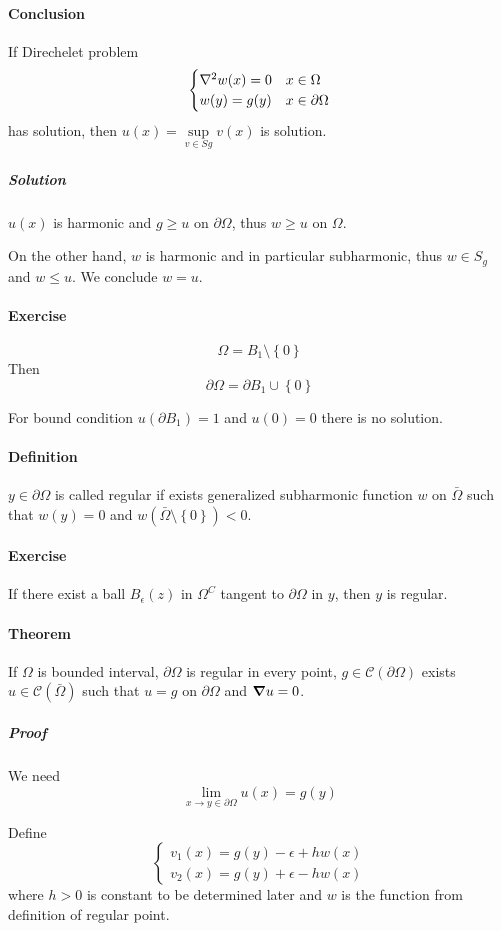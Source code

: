 \paragraph{Conclusion}
If Direchelet problem
$$\begin{cases}
\laplacian{w}(x) = 0 & x\in \Omega\\
w(y) = g(y) & x \in \partial \Omega
\end{cases}$$
has solution, then $u(x)=\sup\limits_{v\in S g} v(x)$ is solution.
\subparagraph{Solution}
$u(x)$ is harmonic and $g \geq u$ on $\partial \Omega$, thus $w\geq u$ on $\Omega$.

On the other hand, $w$ is harmonic and in particular subharmonic, thus $w\in S_g$ and $w\leq u$. We conclude $w=u$.
\paragraph{Exercise}
$$\Omega = B_1 \setminus \left\{ 0 \right\}$$
Then
$$\partial \Omega = \partial B_1 \cup \left\{ 0 \right\}$$

For bound condition $u(\partial B_1) = 1$ and $u(0)=0$ there is no solution.
\paragraph{Definition}
$y\in \partial \Omega$ is called regular if exists generalized subharmonic function $w$ on $\bar{\Omega}$ such that $w(y)=0$ and $w(\bar{\Omega} \setminus \left\{0\right\}) < 0$.
\paragraph{Exercise}
If there exist a ball $B_\epsilon(z)$ in $\Omega^C$ tangent to $\partial \Omega$ in $y$, then $y$ is regular. 
\paragraph{Theorem} If $\Omega$ is bounded interval, $\partial \Omega $ is regular in every point, $g\in \mathcal{C}(\partial \Omega)$  exists $u \in \mathcal{C}(\bar{\Omega})$ such that $u=g$ on  $\partial \Omega $ and $\grad{u}  = 0$.
\subparagraph{Proof}
We need
$$\lim_{x \to y \in \partial \Omega} u(x) = g(y)$$

Define 
$$\begin{cases}
v_1(x) = g(y) -\epsilon + hw(x)\\
v_2(x) = g(y) + \epsilon - hw(x)
\end{cases}$$
where $h>0$ is constant to be determined later and $w$ is the function from definition of regular point.


